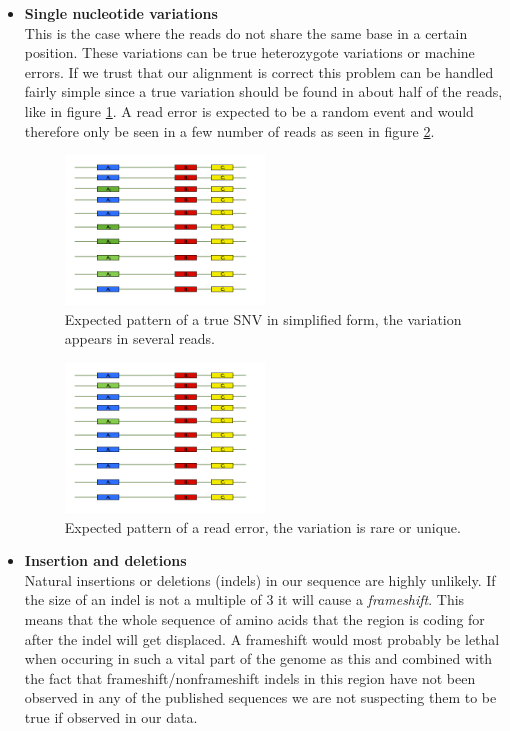 \begin{itemize}
	\item \textbf{Single nucleotide variations}\\
	This is the case where the reads do not share the same base in a certain position. These variations can be true heterozygote variations or machine errors. If we trust that our alignment is correct this problem can be handled fairly simple since a true variation should be found in about half of the reads, like in figure \ref{fig:true_snv}. A read error is expected to be a random event and would therefore only be seen in a few number of reads as seen in figure \ref{fig:false_snv}.\\

	\begin{figure}[ht]
		\centering
			\includegraphics[width=0.5\textwidth]{../pictures/True_SNV.jpg}
		\caption{Expected pattern of a true SNV in simplified form, the variation appears in several reads.}
		\label{fig:true_snv}
	\end{figure}
	
	\begin{figure}[ht]
		\centering
			\includegraphics[width=0.5\textwidth]{../pictures/False_SNV.jpg}
		\caption{Expected pattern of a read error, the variation is rare or unique.}
		\label{fig:false_snv}
	\end{figure}
	
	\item \textbf{Insertion and deletions}\\
	Natural insertions or deletions (indels) in our sequence are highly unlikely. If the size of an indel is not a multiple of 3 it will cause a \emph{frameshift}. This means that the whole sequence of amino acids that the region is coding for after the indel will get displaced. A frameshift would most probably be lethal when occuring in such a vital part of the genome as this and combined with the fact that frameshift/nonframeshift indels in this region have not been observed in any of the published sequences we are not suspecting them to be true if observed in our data.\\
	

\end{itemize}
